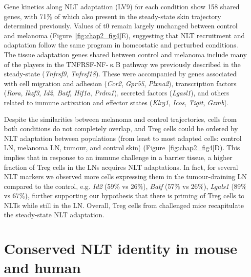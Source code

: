Gene kinetics along NLT adaptation (LV9) for each condition show 158 shared genes, with 71${\%}$ of which also present in the steady-state skin trajectory determined previously. Values of t0 remain largely unchanged between control and melanoma (Figure~\ref{fig:chap2_fig4}E), suggesting that NLT recruitment and adaptation follow the same program in homeostatic and perturbed conditions. The tissue adaptation genes shared between control and melanoma include many of the players in the TNFRSF-NF-${\upkappa}$B pathway we previously described in the steady-state (\textit{Tnfrsf9}, \textit{Tnfrsf18}). These were accompanied by genes associated with cell migration and adhesion (\textit{Ccr2}, \textit{Gpr55}, \textit{Plxna2}), transcription factors (\textit{Rora}, \textit{Ikzf3}, \textit{Id2}, \textit{Batf}, \textit{Hif1a}, \textit{Prdm1}), secreted factors (\textit{Lgasl1}), and others related to immune activation and effector states (\textit{Klrg1}, \textit{Icos}, \textit{Tigit}, \textit{Gzmb}).

Despite the similarities between melanoma and control trajectories, cells from both conditions do not completely overlap, and Treg cells could be ordered by NLT adaptation between populations (from least to most adapted cells: control LN, melanoma LN, tumour, and control skin) (Figure~\ref{fig:chap2_fig4}D). This implies that in response to an immune challenge in a barrier tissue, a higher fraction of Treg cells in the LNs acquires NLT adaptations. In fact, for several NLT markers we observed more cells expressing them in the tumour-draining LN compared to the control, e.g. \textit{Id2} (59${\%}$ vs 26${\%}$), \textit{Batf} (57${\%}$ vs 26${\%}$), \textit{Lgals1} (89${\%}$ vs 67${\%}$), further supporting our hypothesis that there is priming of Treg cells to NLTs while still in the LN. Overall, Treg cells from challenged mice recapitulate the steady-state NLT adaptation.



\section{Conserved NLT identity in mouse and human}
\label{section2.6}

